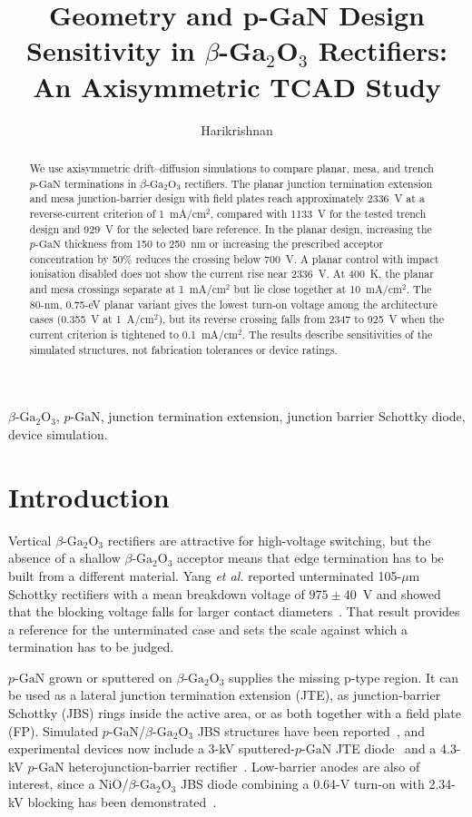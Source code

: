 \documentclass[journal,10pt]{IEEEtran}
\title{Geometry and p-GaN Design Sensitivity in \texorpdfstring{$\beta$-Ga$_2$O$_3$}{beta-Ga2O3} Rectifiers: An Axisymmetric TCAD Study}
\author{Harikrishnan}
\newcommand{\GaO}{\ensuremath{\beta\text{-}\mathrm{Ga}_2\mathrm{O}_3}}
\newcommand{\pGaN}{\ensuremath{p\text{-}\mathrm{GaN}}}
\begin{document}
\maketitle

\begin{abstract}
We use axisymmetric drift--diffusion simulations to compare planar, mesa, and trench \pGaN{} terminations in \GaO{} rectifiers. The planar junction termination extension and mesa junction-barrier design with field plates reach approximately 2336~V at a reverse-current criterion of 1~mA/cm$^2$, compared with 1133~V for the tested trench design and 929~V for the selected bare reference. In the planar design, increasing the \pGaN{} thickness from 150 to 250~nm or increasing the prescribed acceptor concentration by 50\% reduces the crossing below 700~V. A planar control with impact ionisation disabled does not show the current rise near 2336~V. At 400~K, the planar and mesa crossings separate at 1~mA/cm$^2$ but lie close together at 10~mA/cm$^2$. The 80-nm, 0.75-eV planar variant gives the lowest turn-on voltage among the architecture cases (0.355~V at 1~A/cm$^2$), but its reverse crossing falls from 2347 to 925~V when the current criterion is tightened to 0.1~mA/cm$^2$. The results describe sensitivities of the simulated structures, not fabrication tolerances or device ratings.
\end{abstract}

\begin{IEEEkeywords}
\GaO, \pGaN, junction termination extension, junction barrier Schottky diode, device simulation.
\end{IEEEkeywords}

\section{Introduction}
Vertical \GaO{} rectifiers are attractive for high-voltage switching, but the absence of a shallow \GaO{} acceptor means that edge termination has to be built from a different material. Yang \emph{et al.} reported unterminated 105-$\mu$m Schottky rectifiers with a mean breakdown voltage of $975\pm40$~V and showed that the blocking voltage falls for larger contact diameters~\cite{Yang2017}. That result provides a reference for the unterminated case and sets the scale against which a termination has to be judged.

\pGaN{} grown or sputtered on \GaO{} supplies the missing p-type region. It can be used as a lateral junction termination extension (JTE), as junction-barrier Schottky (JBS) rings inside the active area, or as both together with a field plate (FP). Simulated \pGaN/\GaO{} JBS structures have been reported~\cite{Nandi2021_TED,Than2024_PhysScr}, and experimental devices now include a 3-kV sputtered-\pGaN{} JTE diode~\cite{Chang2025_APL} and a 4.3-kV \pGaN{} heterojunction-barrier rectifier~\cite{Chang2026_TED}. Low-barrier anodes are also of interest, since a NiO/\GaO{} JBS diode combining a 0.64-V turn-on with 2.34-kV blocking has been demonstrated~\cite{Su2024_APL}.
\end{document}

